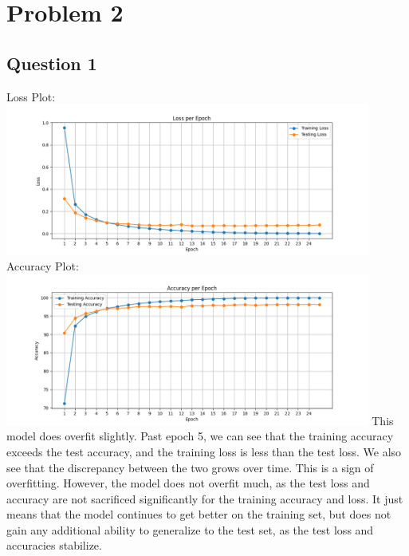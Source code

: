 \documentclass{article}
\begin{document}
\section{Problem 2}
\subsection{Question 1}
Loss Plot:
\newline
\includegraphics[width=0.9\textwidth]{p2_1_lossplot.png}
\newline
Accuracy Plot:
\newline
\includegraphics[width=0.9\textwidth]{p2_1_accplot.png}
\newline
This model does overfit slightly. Past epoch 5, we can see that the training accuracy exceeds the test accuracy, and the training loss is less than the test loss. We also see that the discrepancy between the two grows over time. This is a sign of overfitting. However, the model does not overfit much, as the test loss and accuracy are not sacrificed significantly for the training accuracy and loss. It just means that the model continues to get better on the training set, but does not gain any additional ability to generalize to the test set, as the test loss and accuracies stabilize.
\end{document}
